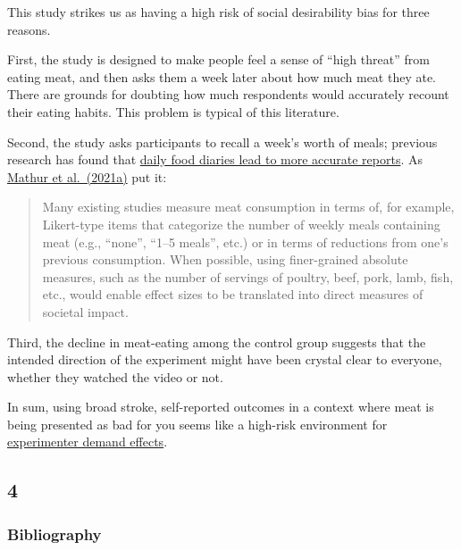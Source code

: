 \documentclass[
  man]{apa6}
\begin{document}
This study strikes us as having a high risk of social desirability bias for three reasons.

First, the study is designed to make people feel a sense of ``high threat'' from eating meat, and then asks them a week later about how much meat they ate. There are grounds for doubting how much respondents would accurately recount their eating habits. This problem is typical of this literature.

Second, the study asks participants to recall a week's worth of meals; previous research has found that \href{https://pubmed.ncbi.nlm.nih.gov/7635601/}{daily food diaries lead to more accurate reports}. As \href{https://www.sciencedirect.com/science/article/pii/S0195666321001847}{Mathur et al.~(2021a)} put it:

\begin{quote}
Many existing studies measure meat consumption in terms of, for example, Likert-type items that categorize the number of weekly meals containing meat (e.g., ``none'', ``1--5 meals'', etc.) or in terms of reductions from one's previous consumption. When possible, using finer-grained absolute measures, such as the number of servings of poultry, beef, pork, lamb, fish, etc., would enable effect sizes to be translated into direct measures of societal impact.
\end{quote}

Third, the decline in meat-eating among the control group suggests that the intended direction of the experiment might have been crystal clear to everyone, whether they watched the video or not.

In sum, using broad stroke, self-reported outcomes in a context where meat is being presented as bad for you seems like a high-risk environment for \href{https://www.elgaronline.com/display/edcoll/9781788110556/9781788110556.00031.xml}{experimenter demand effects}.

\subsection{4}\label{section}

\subsubsection*{Bibliography}\label{bibliography}
\end{document}

